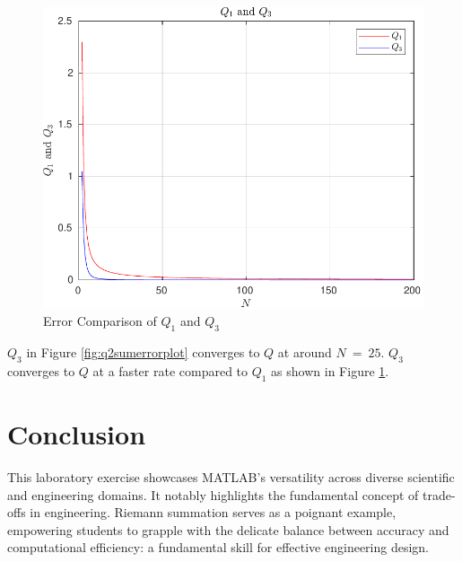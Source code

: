 \documentclass[12pt]{article}
\begin{document}
				\begin{figure}[H]
					\centering
					\includegraphics[width=1\linewidth]{Code/Fig/q1_q3_error_plot}
					\caption{\Large Error Comparison of $Q_{1}$ and $Q_{3}$}
					\label{fig:q1q3errorplot}
				\end{figure}
				
				 $Q_{3}$ in Figure \ref{fig:q2sumerrorplot} converges to $Q$ at around $N \ = \ 25$.
				 $Q_{3}$ converges to $Q$ at a faster rate compared to $Q_{1}$ as shown in Figure \ref{fig:q1q3errorplot}.
				 
	\section{Conclusion}
		This laboratory exercise showcases MATLAB's versatility across diverse scientific and engineering domains. It notably highlights the fundamental concept of trade-offs in engineering. Riemann summation serves as a poignant example, empowering students to grapple with the delicate balance between accuracy and computational efficiency: a fundamental skill for effective engineering design.
\end{document}
